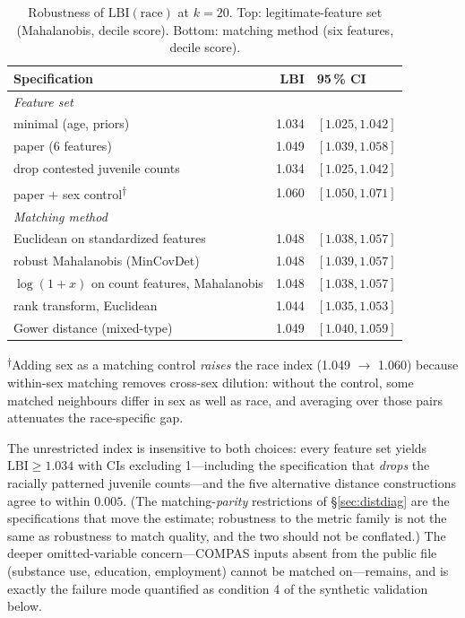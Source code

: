 \documentclass[11pt]{article}
\begin{document}
\begin{table}[h]
\centering
\caption{Robustness of $\mathrm{LBI}(\text{race})$ at $k = 20$.
Top: legitimate-feature set (Mahalanobis, decile score). Bottom:
matching method (six features, decile score).}
\label{tab:robust}
\begin{tabular}{lrl}
\toprule
\textbf{Specification} & \textbf{LBI} & \textbf{95\,\% CI} \\
\midrule
\multicolumn{3}{l}{\emph{Feature set}}\\
\quad minimal (age, priors) & 1.034 & $[1.025, 1.042]$ \\
\quad paper (6 features) & 1.049 & $[1.039, 1.058]$ \\
\quad drop contested juvenile counts & 1.034 & $[1.025, 1.042]$ \\
\quad paper $+$ sex control\textsuperscript{$\dagger$} & 1.060 & $[1.050, 1.071]$ \\
\midrule
\multicolumn{3}{l}{\emph{Matching method}}\\
\quad Euclidean on standardized features & 1.048 & $[1.038, 1.057]$ \\
\quad robust Mahalanobis (MinCovDet) & 1.048 & $[1.039, 1.057]$ \\
\quad $\log(1{+}x)$ on count features, Mahalanobis & 1.048 & $[1.038, 1.057]$ \\
\quad rank transform, Euclidean & 1.044 & $[1.035, 1.053]$ \\
\quad Gower distance (mixed-type) & 1.049 & $[1.040, 1.059]$ \\
\bottomrule
\end{tabular}

\smallskip
{\footnotesize \textsuperscript{$\dagger$}Adding sex as a matching
control \emph{raises} the race index (1.049 $\to$ 1.060) because
within-sex matching removes cross-sex dilution: without the control,
some matched neighbours differ in sex as well as race, and averaging
over those pairs attenuates the race-specific gap.}
\end{table}

The unrestricted index is insensitive to both choices: every feature
set yields $\mathrm{LBI} \geq 1.034$ with CIs excluding 1---including
the specification that \emph{drops} the racially patterned juvenile
counts---and the five alternative distance constructions agree to
within $0.005$. (The matching-\emph{parity} restrictions of
\S\ref{sec:distdiag} are the specifications that move the estimate;
robustness to the metric family is not the same as robustness to
match quality, and the two should not be conflated.) The deeper
omitted-variable concern---COMPAS inputs absent from the public file
(substance use, education, employment) cannot be matched on---remains,
and is exactly the failure mode quantified as condition 4 of the
synthetic validation below.
\end{document}
